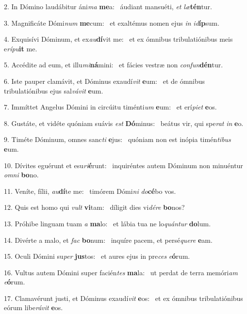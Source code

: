 2. In Dómino laudábitur áni\textit{ma} \textbf{me}a: \ast\  áudiant mansuéti, \textit{et} \textit{læ}\textbf{tén}tur.\

3. Magnificáte Dómi\textit{num} \textbf{me}cum: \ast\  et exaltémus nomen ejus \textit{in} \textit{id}\textbf{íp}sum.\

4. Exquisívi Dóminum, et ex\textit{au}\textbf{dí}vit me: \ast\  et ex ómnibus tribulatiónibus meis e\textit{rí}\textit{pu}\textbf{it} me.\

5. Accédite ad eum, et illu\textit{mi}\textbf{ná}mini: \ast\  et fácies vestræ non \textit{con}\textit{fun}\textbf{dén}tur.\

6. Iste pauper clamávit, et Dóminus exaudí\textit{vit} \textbf{e}um: \ast\  et de ómnibus tribulatiónibus ejus sal\textit{vá}\textit{vit} \textbf{e}um.\

7. Immíttet Angelus Dómini in circúitu timénti\textit{um} \textbf{e}um: \ast\  et erí\textit{pi}\textit{et} \textbf{e}os.\

8. Gustáte, et vidéte quóniam suávis \textit{est} \textbf{Dó}minus: \ast\  beátus vir, qui spe\textit{rat} \textit{in} \textbf{e}o.\

9. Timéte Dóminum, omnes sanc\textit{ti} \textbf{e}jus: \ast\  quóniam non est inópia timén\textit{ti}\textit{bus} \textbf{e}um.\

10. Dívites eguérunt et esu\textit{ri}\textbf{é}runt: \ast\  inquiréntes autem Dóminum non minuéntur \textit{om}\textit{ni} \textbf{bo}no.\

11. Veníte, fílii, \textit{au}\textbf{dí}te me: \ast\  timórem Dómi\textit{ni} \textit{do}\textbf{cé}bo vos.\

12. Quis est homo qui \textit{vult} \textbf{vi}tam: \ast\  díligit dies vi\textit{dé}\textit{re} \textbf{bo}nos?\

13. Próhibe linguam tuam \textit{a} \textbf{ma}lo: \ast\  et lábia tua ne lo\textit{quán}\textit{tur} \textbf{do}lum.\

14. Divérte a malo, et \textit{fac} \textbf{bo}num: \ast\  inquíre pacem, et persé\textit{que}\textit{re} \textbf{e}am.\

15. Oculi Dómini su\textit{per} \textbf{jus}tos: \ast\  et aures ejus in pre\textit{ces} \textit{e}\textbf{ó}rum.\

16. Vultus autem Dómini super facién\textit{tes} \textbf{ma}la: \ast\  ut perdat de terra memóri\textit{am} \textit{e}\textbf{ó}rum.\

17. Clamavérunt justi, et Dóminus exaudí\textit{vit} \textbf{e}os: \ast\  et ex ómnibus tribulatiónibus eórum libe\textit{rá}\textit{vit} \textbf{e}os.\


